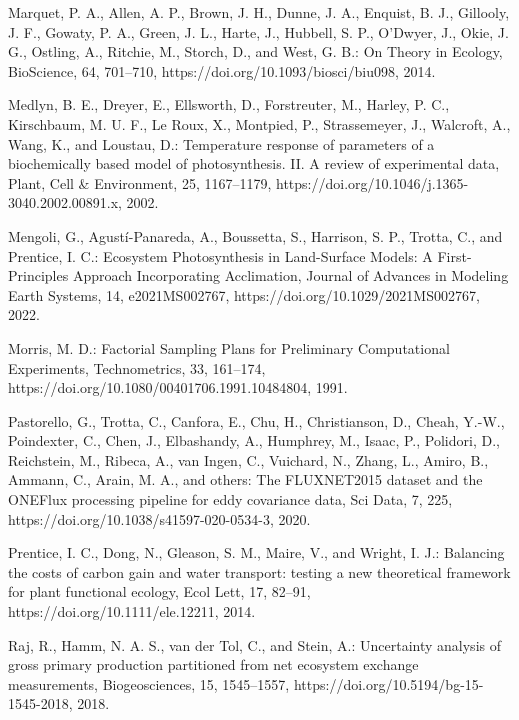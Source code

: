 \documentclass[gmd, manuscript]{copernicus}
\begin{document}
\begin{thebibliography}{}
Marquet, P. A., Allen, A. P., Brown, J. H., Dunne, J. A., Enquist, B. J., Gillooly, J. F., Gowaty, P. A., Green, J. L., Harte, J., Hubbell, S. P., O'Dwyer, J., Okie, J. G., Ostling, A., Ritchie, M., Storch, D., and West, G. B.: On Theory in Ecology, BioScience, 64, 701–710, https://doi.org/10.1093/biosci/biu098, 2014.

Medlyn, B. E., Dreyer, E., Ellsworth, D., Forstreuter, M., Harley, P. C., Kirschbaum, M. U. F., Le Roux, X., Montpied, P., Strassemeyer, J., Walcroft, A., Wang, K., and Loustau, D.: Temperature response of parameters of a biochemically based model of photosynthesis. II. A review of experimental data, Plant, Cell \& Environment, 25, 1167–1179, https://doi.org/10.1046/j.1365-3040.2002.00891.x, 2002.

Mengoli, G., Agustí-Panareda, A., Boussetta, S., Harrison, S. P., Trotta, C., and Prentice, I. C.: Ecosystem Photosynthesis in Land-Surface Models: A First-Principles Approach Incorporating Acclimation, Journal of Advances in Modeling Earth Systems, 14, e2021MS002767, https://doi.org/10.1029/2021MS002767, 2022.

Morris, M. D.: Factorial Sampling Plans for Preliminary Computational Experiments, Technometrics, 33, 161–174, https://doi.org/10.1080/00401706.1991.10484804, 1991.

Pastorello, G., Trotta, C., Canfora, E., Chu, H., Christianson, D., Cheah, Y.-W., Poindexter, C., Chen, J., Elbashandy, A., Humphrey, M., Isaac, P., Polidori, D., Reichstein, M., Ribeca, A., van Ingen, C., Vuichard, N., Zhang, L., Amiro, B., Ammann, C., Arain, M. A., and others: The FLUXNET2015 dataset and the ONEFlux processing pipeline for eddy covariance data, Sci Data, 7, 225, https://doi.org/10.1038/s41597-020-0534-3, 2020.

Prentice, I. C., Dong, N., Gleason, S. M., Maire, V., and Wright, I. J.: Balancing the costs of carbon gain and water transport: testing a new theoretical framework for plant functional ecology, Ecol Lett, 17, 82–91, https://doi.org/10.1111/ele.12211, 2014.

Raj, R., Hamm, N. A. S., van der Tol, C., and Stein, A.: Uncertainty analysis of gross primary production partitioned from net ecosystem exchange measurements, Biogeosciences, 15, 1545–1557, https://doi.org/10.5194/bg-15-1545-2018, 2018.


\end{thebibliography}
\end{document}
